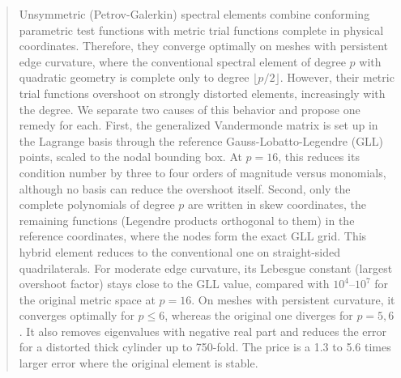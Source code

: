\begin{abstract}
Unsymmetric (Petrov-Galerkin) spectral elements combine conforming parametric test functions with metric trial functions complete in physical coordinates. Therefore, they converge optimally on meshes with persistent edge curvature, where the conventional spectral element of degree $p$ with quadratic geometry is complete only to degree $\lfloor p/2\rfloor$. However, their metric trial functions overshoot on strongly distorted elements, increasingly with the degree. We separate two causes of this behavior and propose one remedy for each. First, the generalized Vandermonde matrix is set up in the Lagrange basis through the reference Gauss-Lobatto-Legendre (GLL) points, scaled to the nodal bounding box. At $p=16$, this reduces its condition number by three to four orders of magnitude versus monomials, although no basis can reduce the overshoot itself. Second, only the complete polynomials of degree $p$ are written in skew coordinates, the remaining functions (Legendre products orthogonal to them) in the reference coordinates, where the nodes form the exact GLL grid. This hybrid element reduces to the conventional one on straight-sided quadrilaterals. For moderate edge curvature, its Lebesgue constant (largest overshoot factor) stays close to the GLL value, compared with $10^4$--$10^7$ for the original metric space at $p=16$. On meshes with persistent curvature, it converges optimally for $p\le6$, whereas the original one diverges for $p=5,6$. It also removes eigenvalues with negative real part and reduces the error for a distorted thick cylinder up to 750-fold. The price is a 1.3 to 5.6 times larger error where the original element is stable.
\end{abstract}
